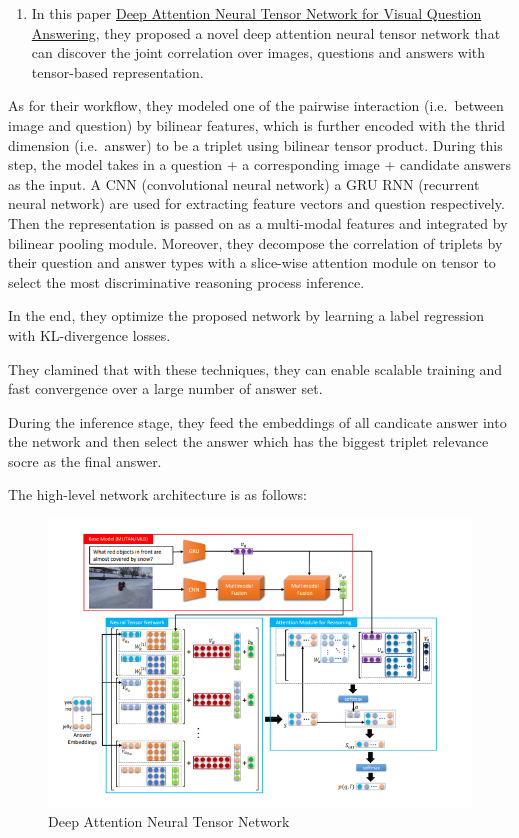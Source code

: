 \documentclass[]{book}
\providecommand{\tightlist}{%
  \setlength{\itemsep}{0pt}\setlength{\parskip}{0pt}}
\theoremstyle{definition}
\theoremstyle{definition}
\theoremstyle{definition}
\theoremstyle{remark}
\begin{document}
\begin{enumerate}
\def\labelenumi{\arabic{enumi}.}
\tightlist
\item
  In this paper
  \href{http://openaccess.thecvf.com/content_ECCV_2018/papers/Yalong_Bai_Deep_Attention_Neural_ECCV_2018_paper.pdf}{Deep
  Attention Neural Tensor Network for Visual Question Answering}, they
  proposed a novel deep attention neural tensor network that can
  discover the joint correlation over images, questions and answers with
  tensor-based representation.
\end{enumerate}

As for their workflow, they modeled one of the pairwise interaction
(i.e.~between image and question) by bilinear features, which is further
encoded with the thrid dimension (i.e.~answer) to be a triplet using
bilinear tensor product. During this step, the model takes in a question
+ a corresponding image + candidate answers as the input. A CNN
(convolutional neural network) a GRU RNN (recurrent neural network) are
used for extracting feature vectors and question respectively. Then the
representation is passed on as a multi-modal features and integrated by
bilinear pooling module. Moreover, they decompose the correlation of
triplets by their question and answer types with a slice-wise attention
module on tensor to select the most discriminative reasoning process
inference.

In the end, they optimize the proposed network by learning a label
regression with KL-divergence losses.

They clamined that with these techniques, they can enable scalable
training and fast convergence over a large number of answer set.

During the inference stage, they feed the embeddings of all candicate
answer into the network and then select the answer which has the biggest
triplet relevance socre as the final answer.

The high-level network architecture is as follows:

\begin{figure}
\centering
\includegraphics{img/vqa.png}
\caption{Deep Attention Neural Tensor Network}
\end{figure}
\end{document}
